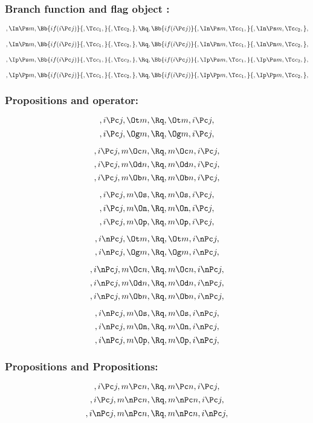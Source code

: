 \bigskip
\bigskip
\bigskip
\bigskip
\subsubsection{Branch function and flag object :}
\[,\In \Ps m, \Bb{if(i \Pc j)}{,\Tc c_1,}{,\Tc c_2,}, \Rq , \Bb{if(i \Pc j)}{,\In \Ps m,\Tc c_1,}{,\In \Ps m,\Tc c_2,},\]
\bigskip
\bigskip

\[,\In \Pn m, \Bb{if(i \Pc j)}{,\Tc c_1,}{,\Tc c_2,}, \Rq , \Bb{if(i \Pc j)}{,\In \Pn m,\Tc c_1,}{,\In \Pn m,\Tc c_2,},\]
\bigskip
\bigskip

\[,\Ip \Ps m, \Bb{if(i \Pc j)}{,\Tc c_1,}{,\Tc c_2,}, \Rq , \Bb{if(i \Pc j)}{,\Ip \Ps m,\Tc c_1,}{,\Ip \Ps m,\Tc c_2,},\]
\bigskip
\bigskip

\[,\Ip \Pp m, \Bb{if(i \Pc j)}{,\Tc c_1,}{,\Tc c_2,}, \Rq , \Bb{if(i \Pc j)}{,\Ip \Pp m,\Tc c_1,}{,\Ip \Pp m,\Tc c_2,},\]
\bigskip
\bigskip





\bigskip
\bigskip
\bigskip
\bigskip
\subsubsection{ Propositions and operator:}
\[, i \Pc j, \Ot m, \Rq , \Ot m, i \Pc j,\]
\[, i \Pc j, \Og m, \Rq , \Og m, i \Pc j,\]

\[, i \Pc j, m \Oc n, \Rq , m \Oc n, i \Pc j,\]
\[, i \Pc j, m \Od n, \Rq , m \Od n, i \Pc j,\]
\[, i \Pc j, m \Ob n, \Rq , m \Ob n, i \Pc j,\]

\[, i \Pc j, m \Os, \Rq , m \Os, i \Pc j,\]
\[, i \Pc j, m \On, \Rq , m \On, i \Pc j,\]
\[, i \Pc j, m \Op, \Rq , m \Op, i \Pc j,\]

\bigskip
\bigskip
\[, i \nPc j, \Ot m, \Rq , \Ot m, i \nPc j,\]
\[, i \nPc j, \Og m, \Rq , \Og m, i \nPc j,\]

\[, i \nPc j, m \Oc n, \Rq , m \Oc n, i \nPc j,\]
\[, i \nPc j, m \Od n, \Rq , m \Od n, i \nPc j,\]
\[, i \nPc j, m \Ob n, \Rq , m \Ob n, i \nPc j,\]

\[, i \nPc j, m \Os, \Rq , m \Os, i \nPc j,\]
\[, i \nPc j, m \On, \Rq , m \On, i \nPc j,\]
\[, i \nPc j, m \Op, \Rq , m \Op, i \nPc j,\]




\bigskip
\bigskip
\bigskip
\bigskip
\subsubsection{ Propositions and Propositions:}
\[,i \Pc j, m \Pc n, \Rq , m \Pc n, i \Pc j,\]
\[,i \Pc j, m \nPc n, \Rq , m \nPc n, i \Pc j,\]
\[,i \nPc j, m \nPc n, \Rq , m \nPc n, i \nPc j,\]

